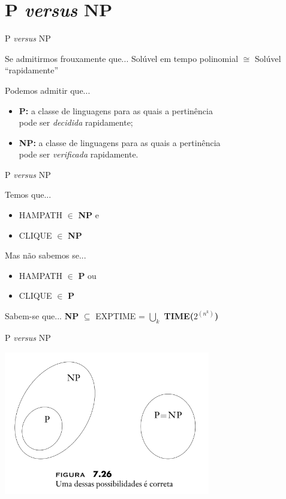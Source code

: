 \documentclass[xcolor=dvipsnames,table]{beamer}
\begin{document}
	\section{P {\it versus} NP}
	\begin{frame}{P {\it versus} NP}
		\begin{block}{Se admitirmos frouxamente que...}
			 Solúvel em tempo polinomial $\cong$ Solúvel ``rapidamente''
		\end{block} \pause
		\begin{block}{Podemos admitir que...} \pause
			\begin{itemize}
				\item {\bf P:} a classe de linguagens para as quais a pertinência \\pode ser {\it decidida} rapidamente; \pause
				\item {\bf NP:} a classe de linguagens para as quais a pertinência \\pode ser {\it verificada} rapidamente.
			\end{itemize}
		\end{block}
	\end{frame}
	
	\begin{frame}{P {\it versus} NP}
		\begin{block}{Temos que...} \pause
			\begin{itemize}
				\item HAMPATH $\in$ {\bf NP} e 
				\item CLIQUE $\in$ {\bf NP}
			\end{itemize}		
		\end{block} \pause
		\begin{alertblock}{Mas não sabemos se...} \pause
			\begin{itemize}
				\item HAMPATH $\in$ {\bf P} ou 
				\item CLIQUE $\in$ {\bf P}
			\end{itemize}		
		\end{alertblock} \pause
		\begin{block}{Sabem-se que...}
			{\bf NP} $\subseteq$ EXPTIME = $\bigcup_k$ {\bf TIME($2^{(n^k)}$)}		
		\end{block}
	\end{frame}
	
	\begin{frame}{P {\it versus} NP}
		\begin{center}
			\includegraphics[width=9cm]{images/pNp.png}
		\end{center}
	\end{frame}	
	
\end{document}
